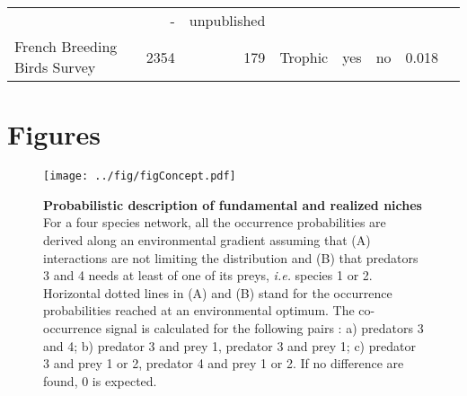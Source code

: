 \begin{longtable}[]{@{}lrrrrrrr@{}}
\begin{minipage}[t]{0.04\columnwidth}
\end{minipage} & \begin{minipage}[t]{0.06\columnwidth}\raggedleft\strut
-\strut
\end{minipage} & \begin{minipage}[t]{0.22\columnwidth}\raggedleft\strut
unpublished\strut
\end{minipage}\tabularnewline
\begin{minipage}[t]{0.15\columnwidth}\raggedright\strut
French Breeding Birds Survey\strut
\end{minipage} & \begin{minipage}[t]{0.07\columnwidth}\raggedleft\strut
2354\strut
\end{minipage} & \begin{minipage}[t]{0.07\columnwidth}\raggedleft\strut
179\strut
\end{minipage} & \begin{minipage}[t]{0.11\columnwidth}\raggedleft\strut
Trophic\strut
\end{minipage} & \begin{minipage}[t]{0.05\columnwidth}\raggedleft\strut
yes\strut
\end{minipage} & \begin{minipage}[t]{0.04\columnwidth}\raggedleft\strut
no\strut
\end{minipage} & \begin{minipage}[t]{0.06\columnwidth}\raggedleft\strut
0.018\strut
\end{minipage} & \begin{minipage}[t]{0.22\columnwidth}\raggedleft\strut
\citet{Gauzere2015}\strut
\end{minipage}\tabularnewline
\bottomrule
\end{longtable}

\newpage

\section{Figures}\label{figures}

\begin{figure}[htbp]
\centering
\texttt{[image: ../fig/figConcept.pdf]}
\caption{\textbf{Probabilistic description of fundamental and realized
niches} For a four species network, all the occurrence probabilities are
derived along an environmental gradient assuming that (A) interactions
are not limiting the distribution and (B) that predators 3 and 4 needs
at least of one of its preys, \emph{i.e.} species 1 or 2. Horizontal
dotted lines in (A) and (B) stand for the occurrence probabilities
reached at an environmental optimum. The co-occurrence signal is
calculated for the following pairs : a) predators 3 and 4; b) predator 3
and prey 1, predator 3 and prey 1; c) predator 3 and prey 1 or 2,
predator 4 and prey 1 or 2. If no difference are found, 0 is
expected.\label{fig:box1}}
\end{figure}

